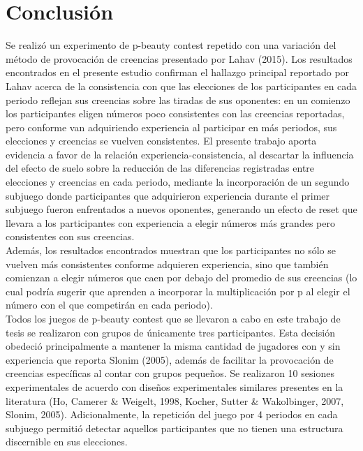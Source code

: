 
\chapter{Conclusión} %

\label{Cap_Conclusion} %

Se realizó un experimento de p-beauty contest repetido con una variación del método de provocación de creencias presentado por Lahav (2015). Los resultados encontrados en el presente estudio confirman el hallazgo principal reportado por Lahav acerca de la consistencia con que las elecciones de los participantes en cada periodo reflejan sus creencias sobre las tiradas de sus oponentes: en un comienzo los participantes eligen números poco consistentes con las creencias reportadas, pero conforme van adquiriendo experiencia al participar en más periodos, sus elecciones y creencias se vuelven consistentes. El presente trabajo aporta evidencia a favor de la relación experiencia-consistencia, al descartar la influencia del efecto de suelo sobre la reducción de las diferencias registradas entre elecciones y creencias en cada periodo, mediante la incorporación de un segundo subjuego donde participantes que adquirieron experiencia durante el primer subjuego fueron enfrentados a nuevos oponentes, generando un efecto de reset que llevara a los participantes con experiencia a elegir números más grandes pero consistentes con sus creencias.\\

Además, los resultados encontrados muestran que los participantes no sólo se vuelven más consistentes conforme adquieren experiencia, sino que también comienzan a elegir números que caen por debajo del promedio de sus creencias (lo cual podría sugerir que aprenden a incorporar la multiplicación por p al elegir el número con el que competirán en cada periodo).\\

Todos los juegos de p-beauty contest que se llevaron a cabo en este trabajo de tesis se realizaron con grupos de únicamente tres participantes. Esta decisión obedeció principalmente a mantener la misma cantidad de jugadores con y sin experiencia que reporta Slonim (2005), además de facilitar la provocación de creencias específicas al contar con grupos pequeños. Se realizaron 10 sesiones experimentales de acuerdo con diseños experimentales similares presentes en la literatura (Ho, Camerer & Weigelt, 1998, Kocher, Sutter & Wakolbinger, 2007, Slonim, 2005). Adicionalmente, la repetición del juego por 4 periodos en cada subjuego permitió detectar aquellos participantes que no tienen una estructura discernible en sus elecciones.\\

